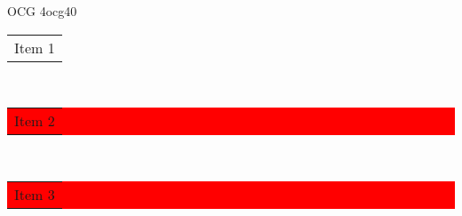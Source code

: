 \documentclass[aspectratio=169]{beamer}
\begin{document}
\begin{frame}
{\begin{minipage}[t]{5cm}
\begin{ocg}{OCG 4}{ocg4}{0}
{{{                                                                                                \begin{tabular}{m{4.3cm}}
                                                                                                    Item 1
                                                                                                \end{tabular}
                                                                                            }\\%
                                                                                            \colorbox{red}{\normalsize \color{white}
                                                                                                \begin{tabular}{m{4.3cm}} 
                                                                                                    Item 2 
                                                                                                \end{tabular}
                                                                                            }\\%
                                                                                            \colorbox{red}{\normalsize \color{white}
                                                                                                \begin{tabular}{m{4.3cm}} 
                                                                                                    Item 3
                                                                                                \end{tabular}
                                                                                            }}%
                                                                                        }%

                                                                                    \end{ocg}
                                                                                \end{minipage}%
                                                                            }
                                                                            \end{frame}
                                                                        
\end{document}
